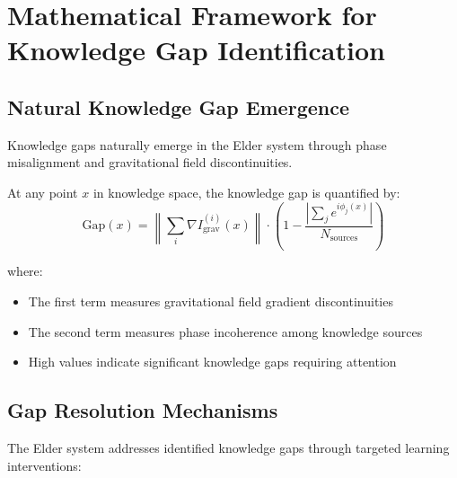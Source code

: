 \section{Mathematical Framework for Knowledge Gap Identification}

\subsection{Natural Knowledge Gap Emergence}

Knowledge gaps naturally emerge in the Elder system through phase misalignment and gravitational field discontinuities.

\begin{definition}
\label{def:knowledge_gap}
At any point $x$ in knowledge space, the knowledge gap is quantified by:
\begin{equation}
\text{Gap}(x) = \left\|\sum_{i} \nabla I_{\text{grav}}^{(i)}(x)\right\| \cdot \left(1 - \frac{|\sum_j e^{i\phi_j(x)}|}{N_{\text{sources}}}\right)
\end{equation}

where:
\begin{itemize}
    \item The first term measures gravitational field gradient discontinuities
    \item The second term measures phase incoherence among knowledge sources
    \item High values indicate significant knowledge gaps requiring attention
\end{itemize}
\end{definition}

\subsection{Gap Resolution Mechanisms}

The Elder system addresses identified knowledge gaps through targeted learning interventions:

